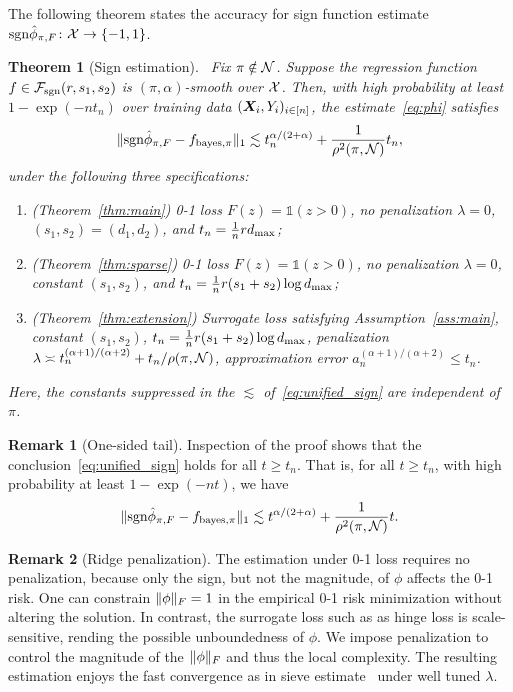 \documentclass[11pt]{article}
\theoremstyle{plain}
\newtheorem{thm}{Theorem}[section]
\theoremstyle{definition}
\newtheorem{rmk}{Remark}
\def\caliF{\tF_{\textup{sgn}}}
\def\sign{\textup{sgn}}
\def\bayespif{f_{\textup{bayes},\pi}}
\def\caliF{\tF_{\textup{sgn}}}
\begin{document}
The following theorem states the accuracy for sign function estimate $\sign \hat \phi_{\pi,F}\colon \tX\to\{-1,1\}$. 
 \begin{thm}[Sign estimation]~\label{thm:unified} Fix $\pi\notin\mathcal{N}$. Suppose the regression function $f\in\caliF(r,s_1,s_2)$ is $(\pi,\alpha)$-smooth over $\mathcal{X}$. Then, with high probability at least $1-\exp(-nt_n)$ over training data $(\bm X_i,Y_i)_{i\in[n]}$, the estimate~\eqref{eq:phi} satisfies
\begin{equation}\label{eq:unified_sign}
\onenormSize{}{\sign \hat \phi_{\pi,F}-\bayespif}\lesssim t_n^{\alpha/( 2+\alpha)}+{1\over \rho^2(\pi,\tN)}t_n,
\end{equation}
under the following three specifications:
\begin{enumerate}[wide, labelwidth=!, labelindent=0pt]
\item[(a)] (Theorem~\ref{thm:main}) 0-1 loss $F(z)=\mathds{1}(z>0)$, no penalization $\lambda=0$, $(s_1,s_2)=(d_1,d_2)$, and $t_n={1\over n}rd_{\max}$;
\item[(b)] (Theorem~\ref{thm:sparse}) 0-1 loss $F(z)=\mathds{1}(z>0)$, no penalization $\lambda=0$, constant $(s_1,s_2)$, and $t_n={1\over n}r(s_1+s_2) \log d_{\max}$;
\item[(c)] (Theorem~\ref{thm:extension}) Surrogate loss satisfying Assumption~\ref{ass:main}, constant $(s_1,s_2)$, $t_n={1\over n} r(s_1+s_2) \log d_{\max}$, penalization $\lambda\asymp t^{(\alpha+1)/(\alpha+2)}_n+t_n/\rho(\pi,\mathcal{N})$, approximation error $a^{(\alpha+1)/(\alpha+2)}_n \leq t_n$.
\end{enumerate}
Here, the constants suppressed in the $\lesssim$ of~\eqref{eq:unified_sign} are independent of $\pi$. 
\end{thm}


\begin{rmk}[One-sided tail]\label{rmk:lt}
Inspection of the proof shows that the conclusion~\eqref{eq:unified_sign} holds for all $t\geq t_n$. That is, for all $t\geq t_n$, with high probability at least $1-\exp(-nt)$, we have
\begin{equation}
\onenormSize{}{\sign \hat \phi_{\pi,F}-\bayespif}\lesssim t^{\alpha/( 2+\alpha)}+{1\over \rho^2(\pi,\tN)}t.
\end{equation}
\end{rmk}


\begin{rmk}[Ridge penalization]
The estimation under 0-1 loss requires no penalization, because only the sign, but not the magnitude, of $\phi$ affects the 0-1 risk. One can constrain $\lVert\phi\rVert_F=1$ in the empirical 0-1 risk minimization without altering the solution. In contrast, the surrogate loss such as as hinge loss is scale-sensitive, rending the possible unboundedness of $\phi$. We impose penalization to control the magnitude of the $\lVert\phi\rVert_F$ and thus the local complexity. The resulting estimation enjoys the fast convergence as in sieve estimate~\citep{shen1994convergence} under well tuned $\lambda$.   
\end{rmk}
\end{document}
